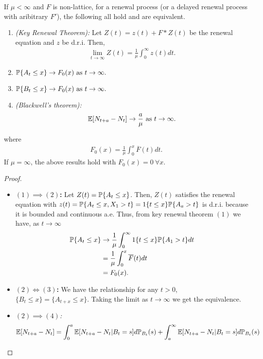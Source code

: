 \documentclass[all-lectures.tex]{subfiles}
\begin{document}
\begin{thm}
If $\mu < \infty$ and $F$ is non-lattice, for a renewal process (or a delayed renewal process with aribitrary $F'$), the following all hold and are equivalent. 
\begin{enumerate}[label=(\arabic*)]
\item \textit{(Key Renewal Theorem):} Let $Z(t) = z(t) + F*Z(t)$ be the renewal equation and $z$ be d.r.i. Then, 
\begin{align*}
\lim_{t\to \infty} Z(t) = \frac{1}{\mu} \int_0^\infty z(t) dt.
\end{align*}
\item $\P\{A_t \leq x\} \to F_0(x) \text{ as } t\to\infty.$
\item $\P\{B_t \leq x\} \to F_0(x) \text{ as } t\to\infty.$
\item \textit{(Blackwell's theorem):} 
\begin{align*}
\E[N_{t+a} - N_t] \to \frac{a}{\mu} \text{ as } t \to \infty.
\end{align*}
\end{enumerate}
where 
\begin{align*}
F_0(x) = \frac{1}{\mu} \int_0^x \overline{F}(t) dt.
\end{align*}
If $\mu = \infty$, the above results hold with $F_0(x)=0 \ \forall x$.
\begin{proof} \ 
\begin{itemize}
\item \textbf{$(1) \implies (2)$:} Let $Z(t) = \P\{A_t \leq x\}$. Then, $Z(t)$ satisfies the renewal equation with $z(t) = \P\{A_t \leq x, X_1 > t\} = 1\{t\leq x\} \P\{A_a>t\}$ is d.r.i. because it is bounded and continuous a.e. Thus, from key renewal theorem $(1)$ we have, as $t \to \infty$
\begin{align*}
\P\{A_t \leq x\} &\to \frac{1}{\mu} \int_0^\infty 1\{t\leq x\} \P\{A_1 >t\} dt \\
&= \frac{1}{\mu} \int_0^x \overline{F}(t) dt \\
&= F_0(x).
\end{align*}
\item \textbf{$(2) \iff (3)$:} We have the relationship for any $t>0$, $\{B_t \leq x\} = \{A_{t+x}\leq x\}$. Taking the limit as $t\to \infty$ we get the equivalence.
\item \textit{$(2) \implies (4)$:}
\begin{align*}
\E[N_{t+a} - N_t] &= \int_0^a \E[N_{t+a} - N_t|B_t = s]d \P_{B_t}(s) + \int_a^\infty  \E[N_{t+a} - N_t|B_t = s]d \P_{B_t}(s) \\

\end{align*}
\end{itemize}
\end{proof}
\end{thm}
\end{document}
